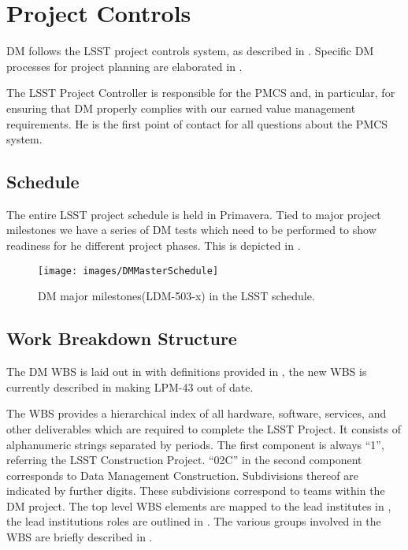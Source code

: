 \newpage
\section{Project Controls}\label{sect:dmpc}

DM follows the LSST project controls system, as described in .
Specific DM processes for project planning are elaborated in .

The LSST Project Controller is responsible for the PMCS and, in particular, for ensuring that DM properly complies with our earned value management requirements.
He is the first point of contact for all questions about the PMCS system.

\subsection{Schedule  \label{sect:schedule} }
The entire LSST project schedule is held in Primavera. Tied to major project milestones we have  a series of DM tests which need to be performed to show readiness for he different project phases. 
This is depicted in .

\begin{figure}[htbp]
	\begin{center}
		 \texttt{[image: images/DMMasterSchedule]}
		 \caption{DM major milestones(LDM-503-x) in the LSST schedule. \label{fig:schedule}}
	 \end{center}
 \end{figure}



\subsection{Work Breakdown Structure} \label{sect:WBS}

The DM WBS is laid out in  with definitions provided in ,
the new WBS is currently described in  making LPM-43 out of date.  

The WBS provides a hierarchical index of all hardware, software, services, and other deliverables which are required to complete the LSST Project.
It consists of alphanumeric strings separated by periods.
The first component is always “1”, referring the LSST Construction Project.
``02C'' in the second component corresponds to Data Management Construction.
Subdivisions thereof are indicated by further digits.
These subdivisions correspond to teams within the DM project.
The top level WBS elements are mapped to the lead institutes in , the lead institutions roles are outlined in .
The various groups involved in the WBS are briefly described in .

